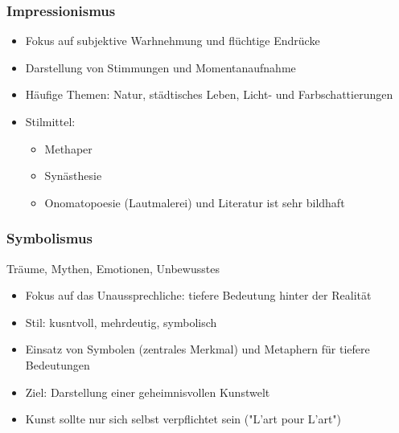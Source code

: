\subsubsection{Impressionismus}
\begin{itemize}
    \item Fokus auf subjektive Warhnehmung und flüchtige Endrücke
    \item Darstellung von Stimmungen und Momentanaufnahme
    \item Häufige Themen: Natur, städtisches Leben, Licht- und Farbschattierungen
    \item Stilmittel:
    \begin{itemize}
        \item Methaper
        \item Synästhesie
        \item Onomatopoesie (Lautmalerei) und Literatur ist sehr bildhaft
    \end{itemize}
\end{itemize}


\subsubsection{Symbolismus}
 Träume, Mythen, Emotionen, Unbewusstes

\begin{itemize}
    \item Fokus auf das Unaussprechliche: tiefere Bedeutung hinter der Realität
    \item Stil: kusntvoll, mehrdeutig, symbolisch
    \item Einsatz von Symbolen (zentrales Merkmal) und Metaphern für tiefere Bedeutungen
    \item Ziel: Darstellung einer geheimnisvollen Kunstwelt
    \item Kunst sollte nur sich selbst verpflichtet sein ("L'art pour L'art")
\end{itemize}

